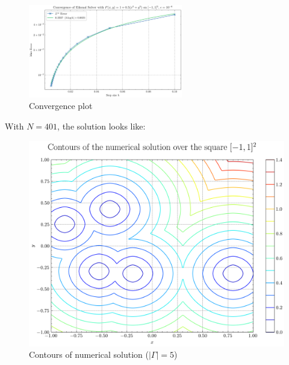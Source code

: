 \documentclass[11pt]{article}
\theoremstyle{definition}
\theoremstyle{remark}
\begin{document}
\begin{figure}[h]
  \centering
  \includegraphics[width=0.6\textwidth]{plots/convergence2d_atan_step_size.png}
  \caption{Convergence plot}
  \label{fig:convarctan}
\end{figure}

With $N=401$, the solution looks like:
\begin{figure}[h]
  \centering
  \begin{minipage}{0.45\textwidth}
    \centering
    \includegraphics[width=\linewidth]{plots/contour_plot_random5.png}
    \caption{Contours of numerical solution ($|\Gamma|=5$)}
    \label{fig:contour5}
  \end{minipage}
  \hfill
  \begin{minipage}{0.45\textwidth}
    \centering

\end{minipage}
\end{figure}
\end{document}
